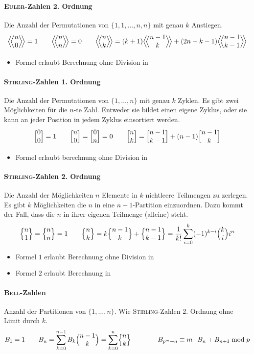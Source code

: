 \paragraph{\textsc{Euler}-Zahlen 2. Ordnung}
Die Anzahl der Permutationen von $\{1,1, \ldots, n,n\}$ mit genau $k$ Anstiegen.
\[\eulerII{n}{0} = 1 \qquad\eulerII{n}{n} = 0 \qquad\eulerII{n}{k} = (k+1) \eulerII{n-1}{k} + (2n-k-1) \eulerII{n-1}{k-1}\]
\begin{itemize}
	\item Formel erlaubt Berechnung ohne Division in 
\end{itemize}

\paragraph{\textsc{Stirling}-Zahlen 1. Ordnung}
Die Anzahl der Permutationen von $\{1, \ldots, n\}$ mit genau $k$ Zyklen.
Es gibt zwei Möglichkeiten für die $n$-te Zahl. Entweder sie bildet einen eigene Zyklus, oder sie kann an jeder Position in jedem Zyklus einsortiert werden.
\[\Bigl[ \begin{matrix} 0 \\ 0 \end{matrix} \Bigr] = 1 \qquad
\Bigl[ \begin{matrix} n \\ 0 \end{matrix} \Bigr] = \Bigl[ \begin{matrix} 0 \\ n \end{matrix} \Bigr] = 0 \qquad
\Bigl[ \begin{matrix} n \\ k \end{matrix} \Bigr] = \Bigl[ \begin{matrix} n-1 \\ k-1 \end{matrix} \Bigr] + (n-1) \Bigl[ \begin{matrix} n-1 \\ k \end{matrix} \Bigr]\]
\begin{itemize}
	\item Formel erlaubt berechnung ohne Division in 
\end{itemize}

\paragraph{\textsc{Stirling}-Zahlen 2. Ordnung}
Die Anzahl der Möglichkeiten $n$ Elemente in $k$ nichtleere Teilmengen zu zerlegen.
Es gibt $k$ Möglichkeiten die $n$ in eine $n-1$-Partition einzuordnen.
Dazu kommt der Fall, dass die $n$ in ihrer eigenen Teilmenge (alleine) steht.
\[\Bigl\{ \begin{matrix} n \\ 1 \end{matrix} \Bigr\} = \Bigl\{ \begin{matrix} n \\ n \end{matrix} \Bigr\} = 1 \qquad
\Bigl\{ \begin{matrix} n \\ k \end{matrix} \Bigr\} = k \Bigl\{ \begin{matrix} n-1 \\ k \end{matrix} \Bigr\} + \Bigl\{ \begin{matrix} n-1 \\ k-1 \end{matrix} \Bigr\} =
\frac{1}{k!} \sum\limits_{i=0}^{k} (-1)^{k-i}\Bigl( \begin{matrix} k \\ i \end{matrix} \Bigr)i^n\]
\begin{itemize}
	\item Formel $1$ erlaubt Berechnung ohne Division in 
	\item Formel $2$ erlaubt Berechnung in 
\end{itemize}

\paragraph{\textsc{Bell}-Zahlen}
Anzahl der Partitionen von $\{1, \ldots, n\}$.
Wie \textsc{Stirling}-Zahlen 2. Ordnung ohne Limit durch $k$.
\[B_1 = 1 \qquad
B_n = \sum\limits_{k = 0}^{n - 1} B_k\Bigl( \begin{matrix} n-1 \\ k \end{matrix} \Bigr)
= \sum\limits_{k = 0}^{n}\Bigl\{ \begin{matrix} n \\ k \end{matrix} \Bigr\}\qquad\qquad B_{p^m+n}\equiv m\cdot B_n + B_{n+1} \bmod{p}\]

